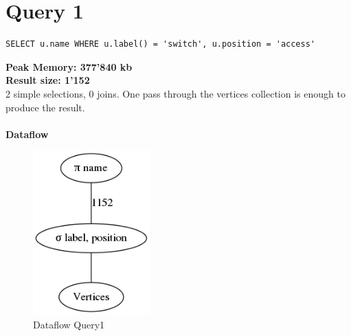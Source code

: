 \documentclass[11pt,singlecolumn]{scrartcl}
\begin{document}
\section{Query 1}
\begin{verbatim}
SELECT u.name WHERE u.label() = 'switch', u.position = 'access'
\end{verbatim}

\textbf{Peak Memory: 377'840 kb}\\
\textbf{Result size: 1'152} \\
2 simple selections, 0 joins. One pass through the vertices collection is enough to produce the result.\\\\
\textbf{Dataflow}
\begin{figure}[H]
\includegraphics[width=0.4\textwidth]{graph1}
\caption{Dataflow Query1}
\end{figure}
\clearpage
\end{document}
